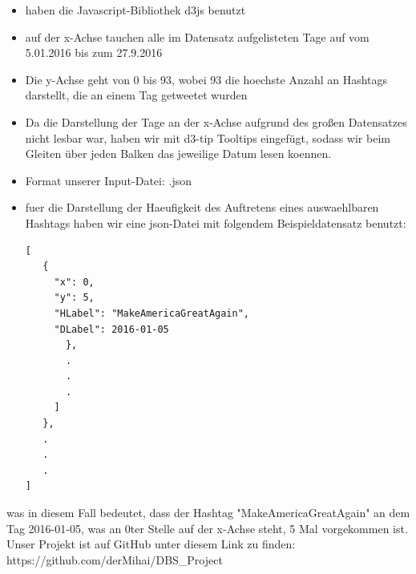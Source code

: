 \documentclass[paper=a4, english, ngerman, romanian]{scrartcl}
\begin{document}
\begin{itemize}
\begin{itemize}
\item haben die Javascript-Bibliothek d3js benutzt
\item auf der x-Achse tauchen alle im Datensatz aufgelisteten Tage auf vom 5.01.2016 bis zum 27.9.2016
\item Die y-Achse geht von 0 bis 93, wobei 93 die hoechste Anzahl an Hashtags darstellt, die an einem Tag getweetet wurden
\item Da die Darstellung der Tage an der x-Achse aufgrund des großen Datensatzes nicht lesbar war, haben wir mit d3-tip Tooltips eingefügt, sodass wir beim Gleiten über jeden Balken das jeweilige Datum lesen koennen.
\item Format unserer Input-Datei: .json
\item fuer die Darstellung der Haeufigkeit des Auftretens eines auswaehlbaren Hashtags haben wir eine json-Datei mit folgendem Beispieldatensatz benutzt:
\begin{lstlisting}
[
   {
     "x": 0,
     "y": 5,
     "HLabel": "MakeAmericaGreatAgain",
     "DLabel": 2016-01-05
       },
       .
       .
       .
     ]
   },
   .
   .
   .
]
				\end{lstlisting}
 
\end{itemize}
was in diesem Fall bedeutet, dass der Hashtag "MakeAmericaGreatAgain" an dem Tag    2016-01-05, was an 0ter Stelle auf der x-Achse steht, 5 Mal vorgekommen ist.\\



Unser Projekt ist auf GitHub unter diesem Link zu finden: https://github.com/derMihai/DBS_Project

  

			\end{itemize}
	
\end{document}
